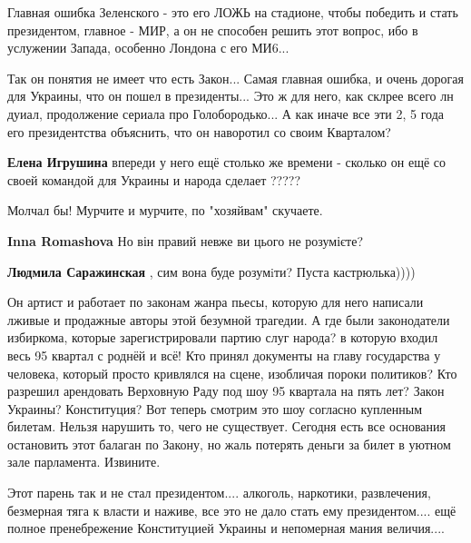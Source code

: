 \begin{itemize}
Главная ошибка Зеленского - это его ЛОЖЬ на стадионе, чтобы победить и стать
президентом, главное - МИР, а он не способен решить этот вопрос, ибо в
услужении Запада, особенно Лондона с его МИ6...


Так он понятия не имеет что есть Закон... Самая главная ошибка, и очень дорогая
для Украины, что он пошел в президенты... Это ж для него, как склрее всего лн
дуиал, продолжение сериала про Голобородько... А как иначе все эти 2, 5 года его
президентства объяснить, что он наворотил со своим Кварталом?

\begin{itemize} %
\textbf{Елена Игрушина} впереди у него ещё столько же времени - сколько он ещё со своей командой для Украины и народа сделает ?????
\end{itemize} %

Молчал бы! Мурчите и мурчите, по "хозяйвам" скучаете.

\begin{itemize} %
\textbf{Inna Romashova} Но він правий невже ви цього не розумієте?


\textbf{Людмила Саражинская} , сим вона буде розумiти? Пуста кастрюлька))))
\end{itemize} %


Он артист и работает по законам жанра пьесы, которую для него написали лживые и
продажные авторы этой безумной трагедии. А где были законодатели избиркома,
которые зарегистрировали партию слуг народа? в которую входил весь 95 квартал с
роднёй и всё! Кто принял документы на главу государства у человека, который
просто кривлялся на сцене, изобличая пороки политиков? Кто разрешил арендовать
Верховную Раду под шоу 95 квартала на пять лет? Закон Украины? Конституция? Вот
теперь смотрим это шоу согласно купленным билетам. Нельзя нарушить то, чего не
существует. Сегодня есть все основания остановить этот балаган по Закону, но
жаль потерять деньги за билет в уютном зале парламента. Извините.



Этот парень так и не стал президентом.... алкоголь, наркотики, развлечения,
безмерная тяга к власти и наживе, все это не дало стать ему президентом.... ещё
полное пренебрежение Конституцией Украины и непомерная мания величия....


\end{itemize}
